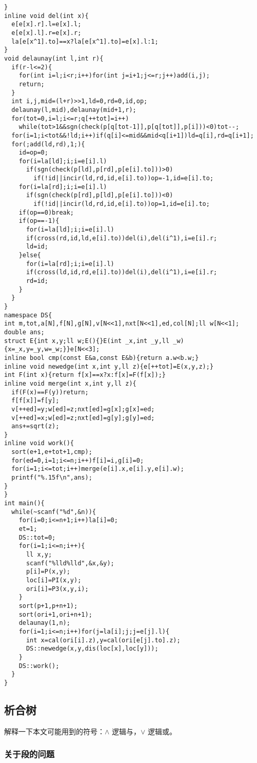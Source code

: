 \documentclass{ctexart}
\begin{document}
\begin{lstlisting}
}
inline void del(int x){
  e[e[x].r].l=e[x].l;
  e[e[x].l].r=e[x].r;
  la[e[x^1].to]==x?la[e[x^1].to]=e[x].l:1;
}
void delaunay(int l,int r){
  if(r-l<=2){
    for(int i=l;i<r;i++)for(int j=i+1;j<=r;j++)add(i,j);
    return;
  }
  int i,j,mid=(l+r)>>1,ld=0,rd=0,id,op;
  delaunay(l,mid),delaunay(mid+1,r);
  for(tot=0,i=l;i<=r;q[++tot]=i++)
    while(tot>1&&sgn(check(p[q[tot-1]],p[q[tot]],p[i]))<0)tot--;
  for(i=1;i<tot&&!ld;i++)if(q[i]<=mid&&mid<q[i+1])ld=q[i],rd=q[i+1];
  for(;add(ld,rd),1;){
    id=op=0;
    for(i=la[ld];i;i=e[i].l)
      if(sgn(check(p[ld],p[rd],p[e[i].to]))>0)
        if(!id||incir(ld,rd,id,e[i].to))op=-1,id=e[i].to;
    for(i=la[rd];i;i=e[i].l)
      if(sgn(check(p[rd],p[ld],p[e[i].to]))<0)
        if(!id||incir(ld,rd,id,e[i].to))op=1,id=e[i].to;
    if(op==0)break;
    if(op==-1){
      for(i=la[ld];i;i=e[i].l)
      if(cross(rd,id,ld,e[i].to))del(i),del(i^1),i=e[i].r;
      ld=id;
    }else{
      for(i=la[rd];i;i=e[i].l)
      if(cross(ld,id,rd,e[i].to))del(i),del(i^1),i=e[i].r;
      rd=id;
    }
  }
}
namespace DS{
int m,tot,a[N],f[N],g[N],v[N<<1],nxt[N<<1],ed,col[N];ll w[N<<1];
double ans;
struct E{int x,y;ll w;E(){}E(int _x,int _y,ll _w){x=_x,y=_y,w=_w;}}e[N<<3];
inline bool cmp(const E&a,const E&b){return a.w<b.w;}
inline void newedge(int x,int y,ll z){e[++tot]=E(x,y,z);}
int F(int x){return f[x]==x?x:f[x]=F(f[x]);}
inline void merge(int x,int y,ll z){
  if(F(x)==F(y))return;
  f[f[x]]=f[y];
  v[++ed]=y;w[ed]=z;nxt[ed]=g[x];g[x]=ed;
  v[++ed]=x;w[ed]=z;nxt[ed]=g[y];g[y]=ed;
  ans+=sqrt(z);
}
inline void work(){
  sort(e+1,e+tot+1,cmp);
  for(ed=0,i=1;i<=n;i++)f[i]=i,g[i]=0;
  for(i=1;i<=tot;i++)merge(e[i].x,e[i].y,e[i].w);
  printf("%.15f\n",ans);
}
}
int main(){
  while(~scanf("%d",&n)){
    for(i=0;i<=n+1;i++)la[i]=0;
    et=1;
    DS::tot=0;
    for(i=1;i<=n;i++){
      ll x,y;
      scanf("%lld%lld",&x,&y);
      p[i]=P(x,y);
      loc[i]=PI(x,y);
      ori[i]=P3(x,y,i);
    }
    sort(p+1,p+n+1);
    sort(ori+1,ori+n+1);
    delaunay(1,n);
    for(i=1;i<=n;i++)for(j=la[i];j;j=e[j].l){
      int x=cal(ori[i].z),y=cal(ori[e[j].to].z);
      DS::newedge(x,y,dis(loc[x],loc[y]));
    }
    DS::work();
  }
}
\end{lstlisting}

\subsection{析合树}

解释一下本文可能用到的符号：$\wedge$ 逻辑与，$\vee$ 逻辑或。

\subsubsection{关于段的问题}
\end{document}
